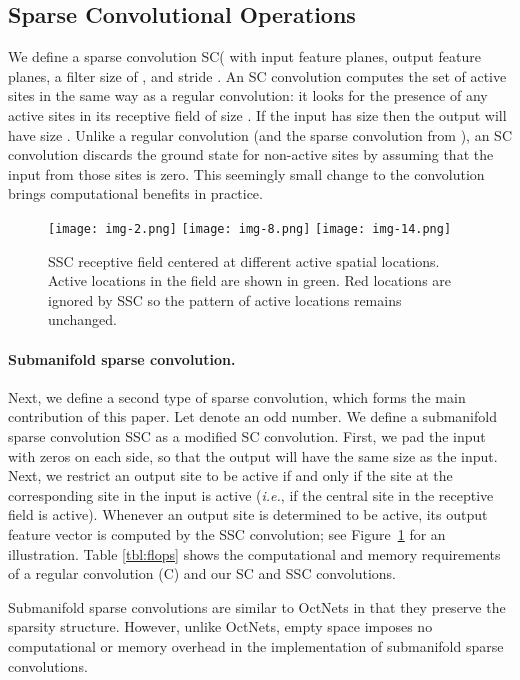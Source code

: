 \documentclass[10pt,twocolumn,letterpaper]{article}
\begin{document}
\subsection{Sparse Convolutional Operations}
We define a sparse convolution SC( with  input
feature planes,  output feature planes, a filter size of ,
and stride .
An SC convolution computes the set of active
sites in the same way as a regular convolution: it looks for the presence of any active sites
in its receptive field of size . If the input has size 
then the output will have size .
Unlike a regular convolution (and the sparse convolution from \cite{graham2015sparse}), an SC convolution discards the ground state for non-active sites by assuming that the input from those sites
is zero. This seemingly small change to the convolution brings
computational benefits in practice.

\begin{figure}[t!]
    \centering
\texttt{[image: img-2.png]}
\texttt{[image: img-8.png]}
\texttt{[image: img-14.png]}
\caption{SSC receptive field centered at different active spatial locations. Active locations in the field are shown in green. Red locations are ignored by SSC so the pattern of active locations remains unchanged.}\label{fig:ssc}
\end{figure}

\paragraph{Submanifold sparse convolution.} Next, we define a second type of sparse convolution, which forms
the main contribution of this paper. Let  denote an odd number.
We define a submanifold
sparse convolution SSC as a modified SC
convolution. First, we pad the input with  zeros on each side,
so that the output will have the same size as the input. Next, we restrict an output
site to be active if and only if the site at the corresponding
site in the input is active (\emph{i.e.}, if the central site in the receptive field is active). Whenever an output site is determined to be active, its output feature vector is computed by the SSC convolution; see Figure~\ref{fig:ssc} for an illustration. Table \ref{tbl:flops} shows the computational and memory requirements of a regular convolution (C) and our SC and SSC convolutions.

Submanifold sparse convolutions are similar to OctNets \cite{riegler2016octnet} in that they preserve the sparsity structure. However, unlike OctNets, empty space imposes no computational or memory overhead in the implementation of submanifold sparse convolutions.
\end{document}
